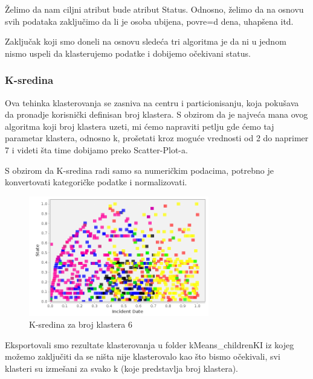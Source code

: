\documentclass[12pt, a4paper]{article}
\def\dj{\leavevmode\setbox0=\hbox{d}\kern0pt
\rlap{\kern.215em\raise.46\ht0\hbox{-}}d}
\begin{document}
\v Zelimo da nam ciljni atribut bude atribut Status. Odnosno, \v zelimo da na osnovu svih podataka zaklju\v cimo da li je osoba ubijena, povre\dj ena, uhap\v sena itd.\break

Zaklju\v cak koji smo doneli na osnovu slede\' ca tri algoritma je da ni u jednom nismo uspeli da klasterujemo podatke i dobijemo o\v cekivani status. 


\subsubsection{K-sredina}	
Ova tehinka klasterovanja se zasniva na centru i particionisanju, koja poku\v sava da pronadje korisni\v cki definisan broj klastera. 
S obzirom da je najve\' ca mana ovog algoritma koji broj klastera uzeti, mi \' cemo napraviti petlju gde \' cemo taj parametar klastera, odnosno k, pro\v setati kroz mogu\' ce vrednosti od 2 do naprimer 7 i videti \v sta time dobijamo preko Scatter-Plot-a.\break

S obzirom da K-sredina radi samo sa numeri\v ckim podacima, potrebno je konvertovati kategori\v cke podatke i normalizovati.\break

\begin{figure}[H]
\centering
\includegraphics[width=0.7\textwidth]{kMeans_6.png}
\caption{K-sredina za broj klastera 6}
\end{figure}

Eksportovali smo rezultate klasterovanja u folder kMeans\_childrenKI iz kojeg mo\v zemo zaklju\v citi da se ni\v sta nije klasterovalo kao \v sto bismo o\v cekivali, svi klasteri su izme\v sani za svako k (koje predstavlja broj klastera). 

\newpage
\end{document}
